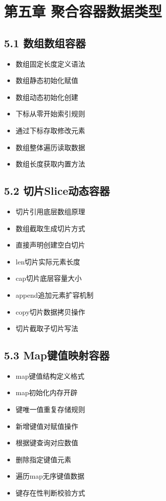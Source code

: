 \section{第五章 聚合容器数据类型}
\subsection{5.1 数组数组容器}
\begin{itemize}
\item 数组固定长度定义语法
\item 数组静态初始化赋值
\item 数组动态初始化创建
\item 下标从零开始索引规则
\item 通过下标存取修改元素
\item 数组整体遍历读取数据
\item 数组长度获取内置方法
\end{itemize}

\subsection{5.2 切片Slice动态容器}
\begin{itemize}
\item 切片引用底层数组原理
\item 数组截取生成切片方式
\item 直接声明创建空白切片
\item len切片实际元素长度
\item cap切片底层容量大小
\item append追加元素扩容机制
\item copy切片数据拷贝操作
\item 切片截取子切片写法
\end{itemize}

\subsection{5.3 Map键值映射容器}
\begin{itemize}
\item map键值结构定义格式
\item map初始化内存开辟
\item 键唯一值重复存储规则
\item 新增键值对赋值操作
\item 根据键查询对应数值
\item 删除指定键值元素
\item 遍历map无序键值数据
\item 键存在性判断校验方式
\end{itemize}

